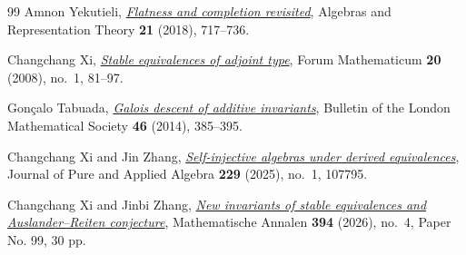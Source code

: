 \documentclass[12pt,a4paper,english,reqno]{amsart}
\numberwithin{equation}{section}
\theoremstyle{plain}
\theoremstyle{definition}
\begin{document}
\begin{thebibliography}{99}
Amnon Yekutieli, \emph{\href{https://doi.org/10.1007/s10468-017-9735-7}
  {Flatness and completion revisited}},
  Algebras and Representation Theory \textbf{21} (2018), 717--736.

Changchang Xi, \emph{\href{https://doi.org/10.1515/FORUM.2008.004}{Stable
  equivalences of adjoint type}}, Forum Mathematicum \textbf{20} (2008), no.~1,
  81--97.

Gon\c{c}alo Tabuada,
  \emph{\href{https://doi.org/10.1112/blms/bdt108}{Galois descent of
  additive invariants}}, Bulletin of the London Mathematical Society
  \textbf{46} (2014), 385--395.

Changchang Xi and Jin Zhang,
  \emph{\href{https://doi.org/10.1016/j.jpaa.2024.107795}{Self-injective
  algebras under derived equivalences}}, Journal of Pure and Applied
  Algebra \textbf{229} (2025), no.~1, 107795.

Changchang Xi and Jinbi Zhang,
  \emph{\href{https://doi.org/10.1007/s00208-026-03422-8}{New invariants of
  stable equivalences and {Auslander--Reiten} conjecture}}, Mathematische
  Annalen \textbf{394} (2026), no.~4, Paper No. 99, 30 pp.

\enlargethispage{2.5\baselineskip}
\end{thebibliography}

\endgroup
\end{document}
